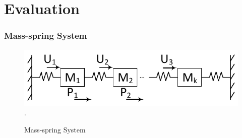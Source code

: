 \documentclass{beamer}
\begin{document}
\section{Evaluation}
\begin{frame}
\frametitle{Mass-spring System}
\begin{figure}[t]
\centering
\captionsetup{justification=centering}
\includegraphics[scale=.48]{../ASAP_17/figure/massspring.pdf}
\DeclareGraphicsExtensions.
\caption{Mass-spring System\label{fig_ms}}
\end{figure}
\end{frame}
\end{document}

